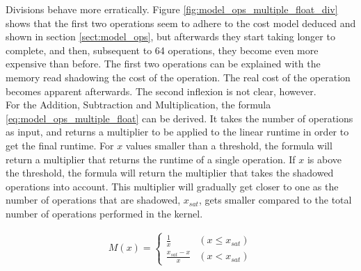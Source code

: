 Divisions behave more erratically. Figure \ref{fig:model_ops_multiple_float_div} shows that the first two operations seem to adhere to the cost model deduced and shown in section \ref{sect:model_ops}, but afterwards they start taking longer to complete, and then, subsequent to 64 operations, they become even more expensive than before. The first two operations can be explained with the memory read shadowing the cost of the operation. The real cost of the operation becomes apparent afterwards. The second inflexion is not clear, however. \\

For the Addition, Subtraction and Multiplication, the formula \ref{eq:model_ops_multiple_float} can be derived. It takes the number of operations as input, and returns a multiplier to be applied to the linear runtime in order to get the final runtime. For $x$ values smaller than a threshold, the formula will return a multiplier that returns the runtime of a single operation. If $x$ is above the threshold, the formula will return the multiplier that takes the shadowed operations into account. This multiplier will gradually get closer to one as the number of operations that are shadowed, $x_{sat}$, gets smaller compared to the total number of operations performed in the kernel.

\begin{gather}
	\label{eq:model_ops_multiple_float}
	M(x) = 	\begin{cases}
				\frac{1}{x} & (x \leq x_{sat})\\
				\frac{x_{sat} - x}{x} & (x < x_{sat})
			\end{cases}
\end{gather} 

